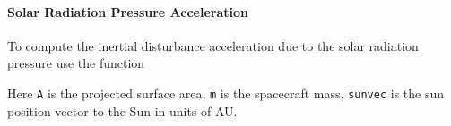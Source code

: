 \paragraph{Solar Radiation Pressure Acceleration}
To compute the inertial disturbance acceleration due to the solar radiation pressure use  the function\\

Here {\tt A} is the projected surface area, {\tt m} is the spacecraft mass, {\tt sunvec} is the sun position vector to the Sun in units of AU.  





